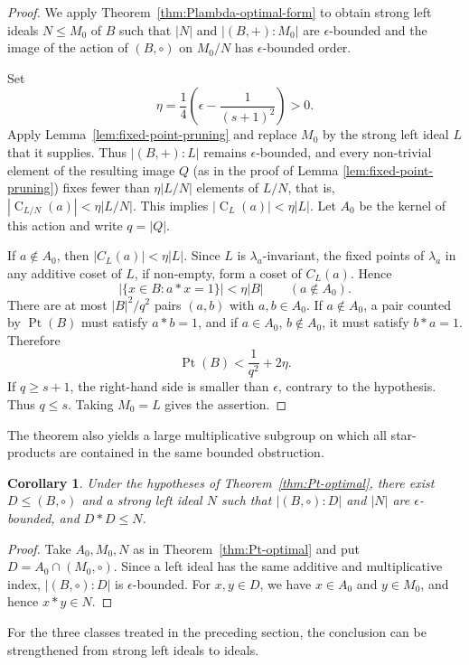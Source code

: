 \documentclass[10pt,a4paper]{amsart}
\numberwithin{equation}{section}
\newtheorem{cor}[equation]{Corollary}
\newcommand{\C}{\operatorname{C} }
\newcommand{\Pt}{\operatorname{Pt} }
\begin{document}
\begin{proof}
We apply Theorem~\ref{thm:Plambda-optimal-form} to obtain strong left
ideals $N\leqslant M_0$ of $B$ such that $|N|$ and $|(B,+):M_0|$ are
$\epsilon$-bounded and the image of the action of $(B,\circ)$ on $M_0/N$ has $\epsilon$-bounded order.

Set
$$
\eta=\frac14\left(\epsilon-\frac1{(s+1)^2}\right)>0.
$$
Apply Lemma~\ref{lem:fixed-point-pruning} and replace $M_0$ by the strong left ideal $L$ that it supplies. Thus $|(B,+):L|$ remains $\epsilon$-bounded, and every non-trivial element of the resulting image $Q$ (as in the proof of Lemma \ref{lem:fixed-point-pruning}) fixes fewer than $\eta|L/N|$ elements of $L/N$,  that is, $|\C_{L/N}(a)|<\eta|L/N|$. This implies $|\C_{L}(a)|<\eta|L|$.  Let
$A_0$ be the kernel of this action and write $q=|Q|$.

If $a\notin A_0$, then $|C_{L}(a)|<\eta|L|$. Since $L$ is
$\lambda_a$-invariant, the fixed points of $\lambda_a$ in any additive
coset of $L$, if non-empty, form a coset of $C_{L}(a)$. Hence
$$
|\{x\in B:a*x= 1\}|<\eta|B|
\qquad(a\notin A_0).
$$
There are at most $|B|^2/q^2$ pairs $(a,b)$ with $a,b\in A_0$. If
$a\notin A_0$, a pair counted by $\Pt(B)$ must satisfy $a*b=1$, and if
$a\in A_0$, $b\notin A_0$, it must satisfy $b*a=1$. Therefore
$$
\Pt(B)<\frac1{q^2}+2\eta.
$$
If $q\geqslant s+1$, the right-hand side is smaller than $\epsilon$,
contrary to the hypothesis. Thus $q\leqslant s$. Taking
$M_0=L$ gives the assertion.
\end{proof}

The theorem also yields a large multiplicative subgroup on which all
star-products are contained in the same bounded obstruction.

\begin{cor}
Under the hypotheses of Theorem~\ref{thm:Pt-optimal}, there exist
$D\leqslant(B,\circ)$ and a strong left ideal $N$ such that
$|(B,\circ):D|$ and $|N|$ are $\epsilon$-bounded,
and  $D*D\leqslant N$.
\end{cor}

\begin{proof}
Take $A_0,M_0,N$ as in Theorem~\ref{thm:Pt-optimal} and put
$D=A_0\cap(M_0,\circ)$. Since a left ideal has the same additive and
multiplicative index, $|(B,\circ):D|$ is $\epsilon$-bounded. For
$x,y\in D$, we have $x\in A_0$ and $y\in M_0$, and hence $x*y\in N$.
\end{proof}

For the three classes treated in the preceding section, the conclusion
can be strengthened from strong left ideals to ideals.
\end{document}
